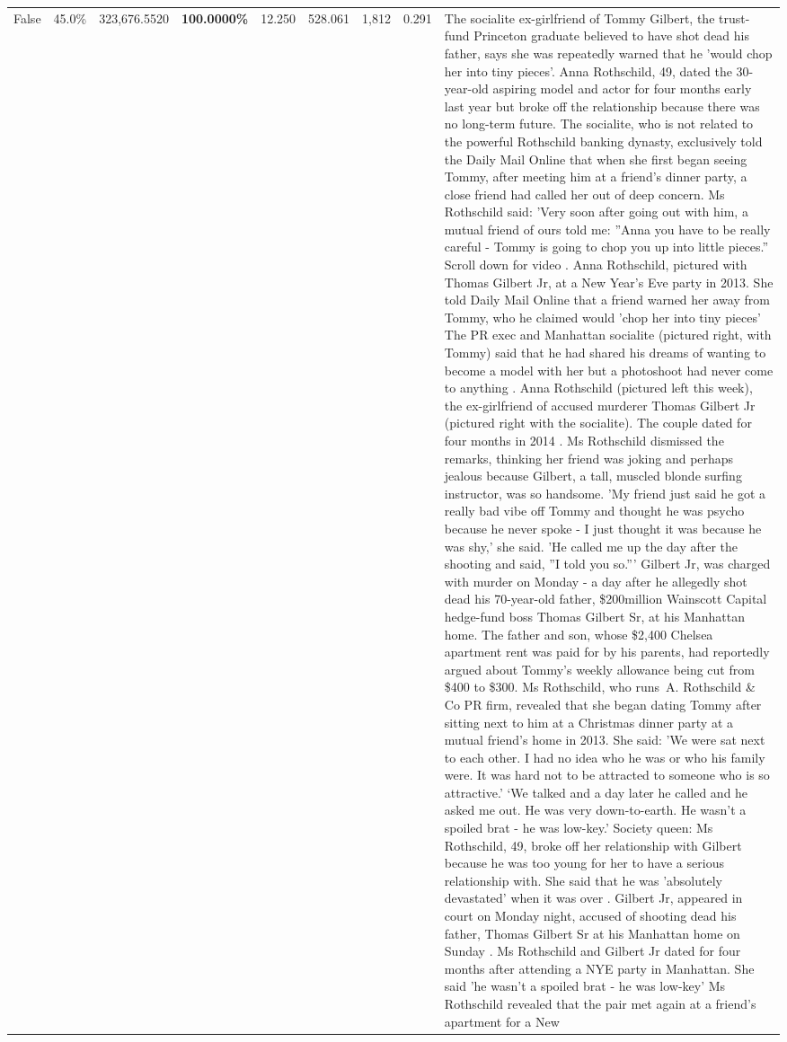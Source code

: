 \begin{table}[H]
\begin{tabular}{lllrlllll}
False & 45.0\% & 323,676.5520 & \bfseries \color{red} 100.0000\% & 12.250 & 528.061 & 1,812 & 0.291 & The socialite ex-girlfriend of Tommy Gilbert, the trust-fund Princeton graduate believed to have shot dead his father, says she was repeatedly warned that he 'would chop her into tiny pieces'. Anna Rothschild, 49, dated the 30-year-old aspiring model and actor for four months early last year but broke off the relationship because there was no long-term future. The socialite, who is not related to the powerful Rothschild banking dynasty, exclusively told the Daily Mail Online that when she first began seeing Tommy, after meeting him at a friend's dinner party, a close friend had called her out of deep concern. Ms Rothschild said: 'Very soon after going out with him, a mutual friend of ours told me: ''Anna you have to be really careful - Tommy is going to chop you up into little pieces.'' Scroll down for video . Anna Rothschild, pictured with Thomas Gilbert Jr, at a New Year's Eve party in 2013. She told Daily Mail Online that a friend warned her away from Tommy, who he claimed would 'chop her into tiny pieces' The PR exec and Manhattan socialite (pictured right, with Tommy) said that he had shared his dreams of wanting to become a model with her but a photoshoot had never come to anything . Anna Rothschild (pictured left this week), the ex-girlfriend of accused murderer Thomas Gilbert Jr (pictured right with the socialite). The couple dated for four months in 2014 . Ms Rothschild dismissed the remarks, thinking her friend was joking and perhaps jealous because Gilbert, a tall, muscled blonde surfing instructor, was so handsome. 'My friend just said he got a really bad vibe off Tommy and thought he was psycho because he never spoke - I just thought it was because he was shy,' she said. 'He called me up the day after the shooting and said, ''I told you so.''' Gilbert Jr, was charged with murder on Monday - a day after he allegedly shot dead his 70-year-old father, \$200million Wainscott Capital hedge-fund boss Thomas Gilbert Sr, at his Manhattan home. The father and son, whose \$2,400 Chelsea apartment rent was paid for by his parents, had reportedly argued about Tommy's weekly allowance being cut from \$400 to \$300. Ms Rothschild, who runs A. Rothschild \& Co PR firm, revealed that she began dating Tommy after sitting next to him at a Christmas dinner party at a mutual friend's home in 2013. She said: 'We were sat next to each other. I had no idea who he was or who his family were. It was hard not to be attracted to someone who is so attractive.' ‘We talked and a day later he called and he asked me out. He was very down-to-earth. He wasn’t a spoiled brat - he was low-key.’ Society queen: Ms Rothschild, 49, broke off her relationship with Gilbert because he was too young for her to have a serious relationship with. She said that he was 'absolutely devastated' when it was over . Gilbert Jr, appeared in court on Monday night, accused of shooting dead his father, Thomas Gilbert Sr at his Manhattan home on Sunday . Ms Rothschild and Gilbert Jr dated for four months after attending a NYE party in Manhattan. She said 'he wasn't a spoiled brat - he was low-key' Ms Rothschild revealed that the pair met again at a friend’s apartment for a New 
\end{tabular}
\end{table}
